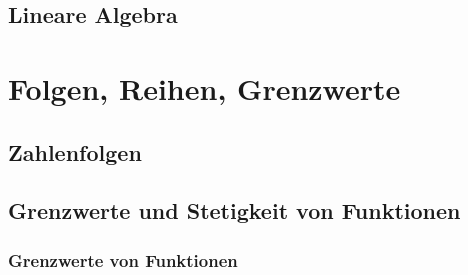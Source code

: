 \section{Lineare Algebra}


\chapter{Folgen, Reihen, Grenzwerte}
\section{Zahlenfolgen}



\section{Grenzwerte und Stetigkeit von Funktionen}
\subsection{Grenzwerte von Funktionen}
